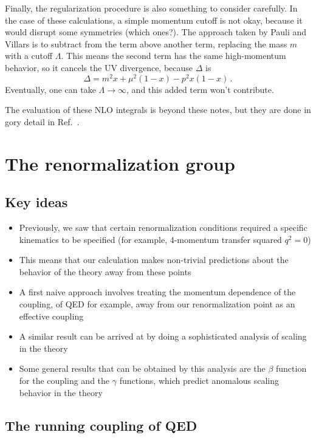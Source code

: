 \documentclass[12pt]{memoir}
\begin{document}
Finally, the regularization procedure is also something to consider carefully.
In the case of these calculations, a simple momentum cutoff is not okay, because it would disrupt some symmetries
(which ones?).
The approach taken by Pauli and Villars is to subtract from the term above another term,
replacing the mass $m$ with a cutoff $\Lambda$.
This means the second term has the same high-momentum behavior, so it cancels the UV divergence,
because $\Delta$ is
\begin{equation}
  \Delta = m^2 x + \mu^2 (1 - x) - p^2 x (1 - x)\,.
\end{equation}
Eventually, one can take $\Lambda \rightarrow \infty$, and this added term won't contribute.

The evaluation of these NLO integrals is beyond these notes,
but they are done in gory detail in Ref.~\cite{Peskin:1995ev}.

\chapter{The renormalization group}

\section{Key ideas}

\begin{itemize}
  \item Previously, we saw that certain renormalization conditions required a specific kinematics to be specified
    (for example, 4-momentum transfer squared $q^2=0$)
  \item This means that our calculation makes non-trivial predictions about the behavior of the theory away from these points
  \item A first naive approach involves treating the momentum dependence of the coupling,
    of QED for example,
    away from our renormalization point as an effective coupling
  \item A similar result can be arrived at by doing a sophisticated analysis of scaling in the theory
  \item Some general results that can be obtained by this analysis are the $\beta$ function for the coupling
    and the $\gamma$ functions, which predict anomalous scaling behavior in the theory
\end{itemize}

\section{The running coupling of QED}
\end{document}
